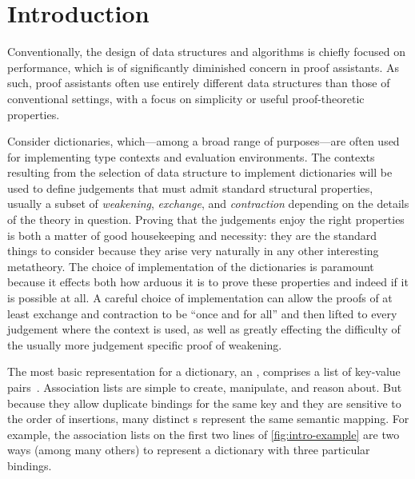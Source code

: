 \section{Introduction}
\label{sec:Introduction}


Conventionally, the design of data structures and algorithms is chiefly focused on performance, which is of significantly diminished concern in proof assistants.
%
As such, proof assistants often use entirely different data structures than those of conventional settings, with a focus on simplicity or useful proof-theoretic properties.

Consider dictionaries, which---among a broad range of purposes---are often
used for implementing type contexts and evaluation environments. The
contexts resulting from the selection of data structure to implement
dictionaries will be used to define judgements that must admit standard
structural properties, usually a subset of \emph{weakening},
\emph{exchange}, and \emph{contraction} depending on the details of the
theory in question. Proving that the judgements enjoy the right properties
is both a matter of good housekeeping and necessity: they are the standard
things to consider because they arise very naturally in any other
interesting metatheory. The choice of implementation of the dictionaries is
paramount because it effects both how arduous it is to prove these
properties and indeed if it is possible at all. A careful choice of
implementation can allow the proofs of at least exchange and contraction to
be ``once and for all'' and then lifted to every judgement where the
context is used, as well as greatly effecting the difficulty of the usually
more judgement specific proof of weakening.

%
The most basic representation for a dictionary, an \emph{\sal}, comprises a
list of key-value pairs~\citep[Lists]{Pierce:SF1}.
%
Association lists are simple to create, manipulate, and reason about.
%
But because they allow duplicate bindings for the same key and they are sensitive to the order of insertions, many distinct \sal{}s represent the same semantic mapping.
%
For example, the association lists on the first two lines of \autoref{fig:intro-example}
%
%
are two ways (among many others) to represent a dictionary with three particular bindings.

